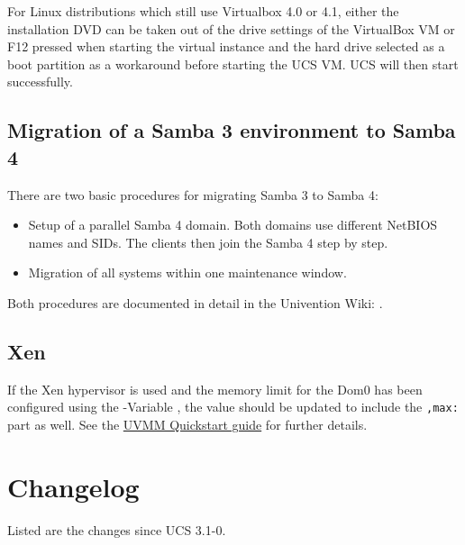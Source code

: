 For Linux distributions which still use Virtualbox 4.0 or 4.1, either
the installation DVD can be taken out of the drive settings of the
VirtualBox VM or F12 pressed when starting the virtual instance and
the hard drive selected as a boot partition as a workaround before
starting the UCS VM. UCS will then start successfully.

\section{Migration of a Samba 3 environment to Samba 4}
\label{samba-migration}

There are two basic procedures for migrating Samba 3 to Samba 4:

\begin{itemize}
\item Setup of a parallel Samba 4 domain. Both domains use different
NetBIOS names and SIDs. The clients then join the Samba 4 step by
step.
\item Migration of all systems within one maintenance window.
\end{itemize}

Both procedures are documented in detail in the Univention Wiki:
.

\section{Xen} %
If the Xen hypervisor is used and the memory limit for the Dom0 has been configured using the \ucsUCR{}-Variable , the value should be updated to include the \texttt{,max:} part as well.
See the \href{http://wiki.univention.de/index.php?title=UVMM_Quickstart-3.1/en#Configuring_the_Dom0}{UVMM Quickstart guide} for further details.

\chapter{Changelog}

Listed are the changes since UCS 3.1-0.






